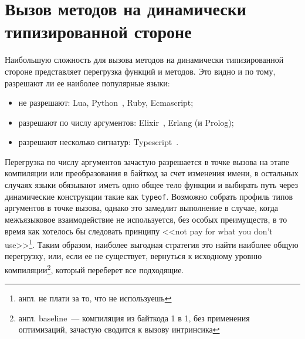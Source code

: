 \documentclass[times
]{itmo-student-thesis}
\begin{document}
\section{Вызов методов на динамически типизированной стороне}
Наибольшую сложность для вызова методов на динамически типизированной стороне представляет перегрузка функций и методов. Это видно и по тому, разрешают ли ее наиболее популярные языки:
\begin{itemize}
	\item не разрешают: Lua, Python~\cite{overload-python}, Ruby, Ecmascript;
	\item разрешают по числу аргументов: Elixir~\cite{overload-elixir}, Erlang (и Prolog);
	\item разрешают несколько сигнатур: Typescript~\cite{overload-typescript}.
\end{itemize}
Перегрузка по числу аргументов зачастую разрешается в точке вызова на этапе компиляции или преобразования в байткод за счет изменения имени, в остальных случаях языки обязывают иметь одно общее тело функции и выбирать путь через динамические конструкции такие как \texttt{typeof}. Возможно собрать профиль типов аргументов в точке вызова, однако это замедлит выполнение в случае, когда межъязыковое взаимодействие не используется, без особых преимуществ, в то время как хотелось бы следовать принципу <<not pay for what you don't use>>\footnote{англ. не плати за то, что не используешь}. Таким образом, наиболее выгодная стратегия это найти наиболее общую перегрузку, или, если ее не существует, вернуться к исходному уровню компиляции\footnote{англ. baseline~--- компиляция из байткода 1 в 1, без применения оптимизаций, зачастую сводится к вызову интринсика}, который переберет все подходящие.
\end{document}
